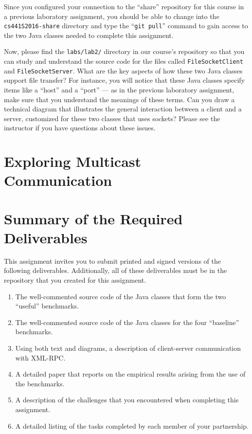 Since you configured your connection to the ``share'' repository for this course in a previous laboratory assignment,
you should be able to change into the {\tt cs441S2016-share} directory and type the ``{\tt git pull}'' command to gain
access to the two Java classes needed to complete this assignment.

Now, please find the {\tt labs/lab2/} directory in our course's repository so that you can study and understand the
source code for the files called {\tt FileSocketClient} and {\tt FileSocketServer}. What are the key aspects of how
these two Java classes support file transfer? For instance, you will notice that these Java classes specify items like a
``host'' and a ``port'' --- as in the previous laboratory assignment, make sure that you understand the meanings of
these terms. Can you draw a technical diagram that illustrates the general interaction between a client and a server,
customized for these two classes that uses sockets? Please see the instructor if you have questions about these issues.

\section*{Exploring Multicast Communication}



\section*{Summary of the Required Deliverables}

This assignment invites you to submit printed and signed versions of the following deliverables. Additionally,
all of these deliverables must be in the repository that you created for this assignment.

\vspace*{-.15in}

\begin{enumerate}
  \itemsep 0em

    \item The well-commented source code of the Java classes that form the two ``useful'' benchmarks.

    \item The well-commented source code of the Java classes for the four ``baseline'' benchmarks.

    \item Using both text and diagrams, a description of client-server communication with XML-RPC.

    \item A detailed paper that reports on the empirical results arising from the use of the benchmarks.

    \item A description of the challenges that you encountered when completing this assignment.

    \item A detailed listing of the tasks completed by each member of your partnership.

\end{enumerate}

